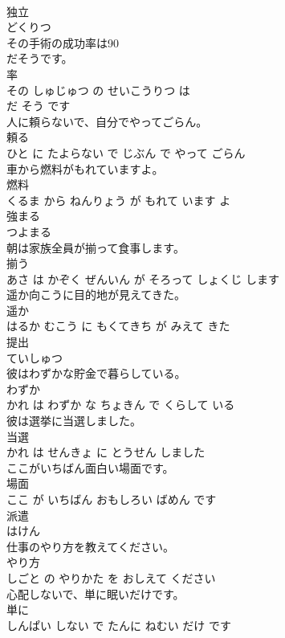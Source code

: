\documentclass[8pt]{extreport}
\begin{document}
\begin{CJK}{UTF8}{min}
\\	独立	
\\	どくりつ			
\\	その手術の成功率は90
\\	だそうです。	
\\	率 
\\	その しゅじゅつ の せいこうりつ は 
\\	だ そう です			
\\	人に頼らないで、自分でやってごらん。	
\\	頼る 
\\	ひと に たよらない で じぶん で やって ごらん			
\\	車から燃料がもれていますよ。	
\\	燃料 
\\	くるま から ねんりょう が もれて います よ			
\\	強まる	
\\	つよまる			
\\	朝は家族全員が揃って食事します。	
\\	揃う 
\\	あさ は かぞく ぜんいん が そろって しょくじ します			
\\	遥か向こうに目的地が見えてきた。	
\\	遥か 
\\	はるか むこう に もくてきち が みえて きた			
\\	提出	
\\	ていしゅつ			
\\	彼はわずかな貯金で暮らしている。	
\\	わずか 
\\	かれ は わずか な ちょきん で くらして いる			
\\	彼は選挙に当選しました。	
\\	当選 
\\	かれ は せんきょ に とうせん しました			
\\	ここがいちばん面白い場面です。	
\\	場面 
\\	ここ が いちばん おもしろい ばめん です			
\\	派遣	
\\	はけん			
\\	仕事のやり方を教えてください。	
\\	やり方 
\\	しごと の やりかた を おしえて ください			
\\	心配しないで、単に眠いだけです。	
\\	単に 
\\	しんぱい しない で たんに ねむい だけ です			

\end{CJK}
\end{document}
